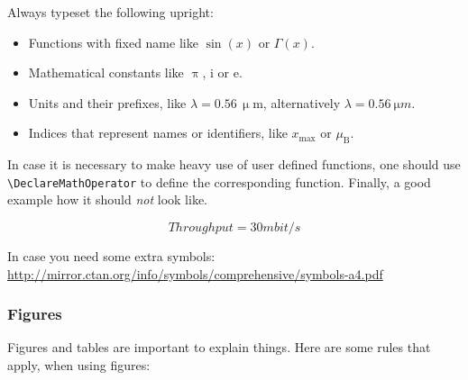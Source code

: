 Always typeset the following upright:

\begin{itemize}
\item Functions with fixed name like $\sin(x)$ or $\Gamma (x)$.
\item Mathematical constants like $\uppi$, $\mathrm{i}$ or $\mathrm{e}$.
\item Units and their prefixes, like $\lambda = 0.56\,\upmu\mathrm{m}$, alternatively $\lambda = \SI{0.56}{\micro m}$.
\item Indices that represent names or identifiers, like $x_\mathrm{max}$ or $\mu_\mathrm B$.
\end{itemize}
  
In case it is necessary to make heavy use of user defined functions, one should use \texttt{\textbackslash\/DeclareMathOperator} to define the corresponding function. Finally, a good example how it should \emph{not} look like.

\[
Throughput = 30 mbit/s
\]

In case you need some extra symbols: \url{http://mirror.ctan.org/info/symbols/comprehensive/symbols-a4.pdf}

\subsubsection{Figures}

Figures and tables are important to explain things. Here are some rules that apply, when using figures:

